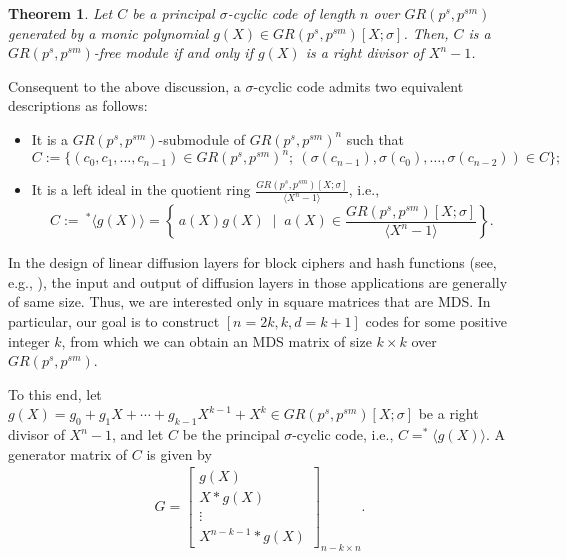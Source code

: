 \documentclass[11pt]{article}
\newtheorem{theorem}{Theorem}
\begin{document}
\begin{theorem}\cite[Theorem~2]{Bhaintwal2012Skew}\label{thm:principal-sigma-cyclic}
Let $C$ be a principal $\sigma$-cyclic code of length $n$ over $GR(p^s,p^{sm})$ generated by a monic polynomial $g(X) \in GR(p^s,p^{sm})[X;\sigma]$. Then, $C$ is a $GR(p^s,p^{sm})$-free module if and only if $g(X)$ is a right divisor of $X^n - 1$.
\end{theorem}

 Consequent to the above discussion, a $\sigma$-cyclic code admits two equivalent descriptions as follows:
\begin{itemize}
    \item[\textnormal{(i)}] It is a $GR(p^s,p^{sm})$-submodule of $GR(p^s,p^{sm})^n$ such that
    \[
    C := \{(c_0, c_1, \dots, c_{n-1}) \in GR(p^s,p^{sm})^n;~
    (\sigma(c_{n-1}), \sigma(c_0), \dots, \sigma(c_{n-2})) \in C\};
    \]
    \item[\textnormal{(ii)}] It is a left ideal in  the quotient ring $\frac{GR(p^s,p^{sm})[X;\sigma]}{\langle X^n-1\rangle}$, i.e.,
    \[
    C := ~^\ast\langle g(X)\rangle = \left\{\,a(X)g(X) \;\mid\; a(X)\in \frac{GR(p^s,p^{sm})[X;\sigma]}{\langle X^n-1 \rangle}\right\}.
    \]
\end{itemize}





\noindent In the design of linear diffusion layers for block ciphers and hash functions (see, e.g., \cite{Daemen2002the, Guo2011the, Guo2011TheLED}), the input and output of diffusion layers in those applications are generally of same size. Thus, we are interested only in square matrices that are MDS. 
In particular, our goal is to construct $[n=2k, k, d=k+1]$ codes for some positive integer $k$, from which we can obtain an MDS matrix of size $k \times k$ over $GR(p^s,p^{sm})$.
 

To this end, let 
\(
    g(X) = g_0 + g_1X + \cdots + g_{k-1}X^{k-1} + X^k \in GR(p^s,p^{sm})[X;\sigma]
\) 
be a right divisor of $X^{n} - 1$, and let $C$ be the principal $\sigma$-cyclic code, i.e., 
\(
    C = ^\ast\langle g(X) \rangle.
\)  A generator matrix of $C$ is given by
\begin{eqnarray}\label{Equation_gen0}
  	G = \begin{bmatrix}
  		g(X)\\
        X\ast g(X)\\
        \vdots\\
        X^{n-k-1}\ast g(X)
  	\end{bmatrix}_{n-k\times n}.
\end{eqnarray} 
\end{document}

